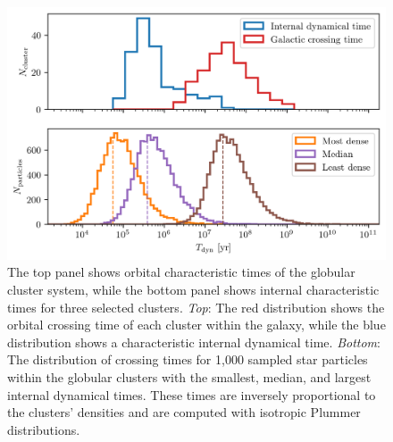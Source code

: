         \begin{figure}
            \centering
            \includegraphics[width=\linewidth]{images/GCsystemCharacteristicTimes.png}
            \caption{The top panel shows orbital characteristic times of the globular cluster system, while the bottom panel shows internal characteristic times for three selected clusters. \textit{Top}: The red distribution shows the orbital crossing time of each cluster within the galaxy, while the blue distribution shows a characteristic internal dynamical time. \textit{Bottom}: The distribution of crossing times for 1,000 sampled star particles within the globular clusters with the smallest, median, and largest internal dynamical times. These times are inversely proportional to the clusters' densities and are computed with isotropic Plummer distributions.}
            \label{fig:GCsystemCharacteristicTimes}
        \end{figure}

